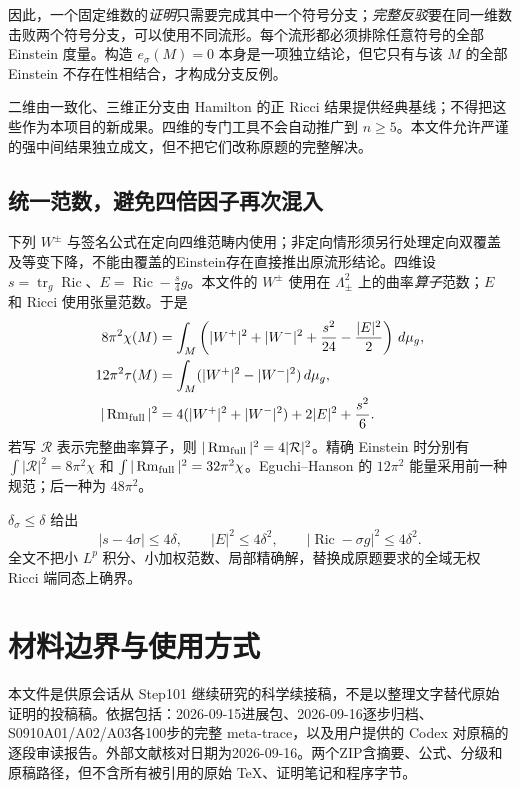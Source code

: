 \documentclass[UTF8,a4paper,11pt,fontset=fandol]{ctexart}
\numberwithin{equation}{section}
\theoremstyle{definition}
\newcommand{\Ric}{\operatorname{Ric}}
\newcommand{\Rm}{\operatorname{Rm}}
\newcommand{\tr}{\operatorname{tr}}
\newcommand{\dd}{\,d\mu_g}
\begin{document}
因此，一个固定维数的\emph{证明}只需要完成其中一个符号分支；\emph{完整反驳}要在同一维数击败两个符号分支，可以使用不同流形。每个流形都必须排除任意符号的全部 Einstein 度量。构造 $e_\sigma(M)=0$ 本身是一项独立结论，但它只有与该 $M$ 的全部 Einstein 不存在性相结合，才构成分支反例。

二维由一致化、三维正分支由 Hamilton 的正 Ricci 结果提供经典基线；不得把这些作为本项目的新成果。四维的专门工具不会自动推广到 $n\ge5$。本文件允许严谨的强中间结果独立成文，但不把它们改称原题的完整解决。

\subsection{统一范数，避免四倍因子再次混入}
下列 $W^\pm$ 与签名公式在定向四维范畴内使用；非定向情形须另行处理定向双覆盖及等变下降，不能由覆盖的Einstein存在直接推出原流形结论。四维设 $s=\tr_g\Ric$、$E=\Ric-\frac{s}{4}g$。本文件的 $W^\pm$ 使用在 $\Lambda^2_\pm$ 上的曲率\emph{算子}范数；$E$ 和 Ricci 使用张量范数。于是
\begin{align}
8\pi^2\chi(M)&=\int_M\left(|W^+|^2+|W^-|^2+\frac{s^2}{24}-\frac{|E|^2}{2}\right)\dd,\label{eq:CGB}\\
12\pi^2\tau(M)&=\int_M(|W^+|^2-|W^-|^2)\dd,\label{eq:signature}\\
|\Rm_{\rm full}|^2&=4(|W^+|^2+|W^-|^2)+2|E|^2+\frac{s^2}{6}.
\end{align}
若写 $\mathcal R$ 表示完整曲率算子，则 $|\Rm_{\rm full}|^2=4|\mathcal R|^2$。精确 Einstein 时分别有 $\int|\mathcal R|^2=8\pi^2\chi$ 和 $\int|\Rm_{\rm full}|^2=32\pi^2\chi$。Eguchi--Hanson 的 $12\pi^2$ 能量采用前一种规范；后一种为 $48\pi^2$。

$\delta_\sigma\le\delta$ 给出
\begin{equation}
 |s-4\sigma|\le4\delta,\qquad |E|^2\le4\delta^2,\qquad
 |\Ric-\sigma g|^2\le4\delta^2.
\end{equation}
全文不把小 $L^p$ 积分、小加权范数、局部精确解，替换成原题要求的全域无权 Ricci 端同态上确界。

\section{材料边界与使用方式}
本文件是供原会话从 Step101 继续研究的科学续接稿，不是以整理文字替代原始证明的投稿稿。依据包括：2026-09-15进展包、2026-09-16逐步归档、S0910A01/A02/A03各100步的完整 meta-trace，以及用户提供的 Codex 对原稿的逐段审读报告。外部文献核对日期为2026-09-16。两个ZIP含摘要、公式、分级和原稿路径，但不含所有被引用的原始 TeX、证明笔记和程序字节。
\end{document}
